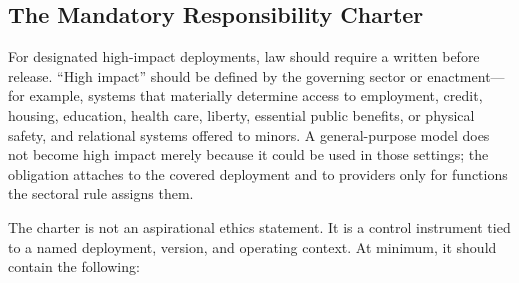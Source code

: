 \subsection{The Mandatory Responsibility Charter}

For designated high-impact deployments, law should require a written \Charter{} before release. ``High impact'' should be defined by the governing sector or enactment---for example, systems that materially determine access to employment, credit, housing, education, health care, liberty, essential public benefits, or physical safety, and relational systems offered to minors. A general-purpose model does not become high impact merely because it could be used in those settings; the obligation attaches to the covered deployment and to providers only for functions the sectoral rule assigns them.

The charter is not an aspirational ethics statement. It is a control instrument tied to a named deployment, version, and operating context. At minimum, it should contain the following:

